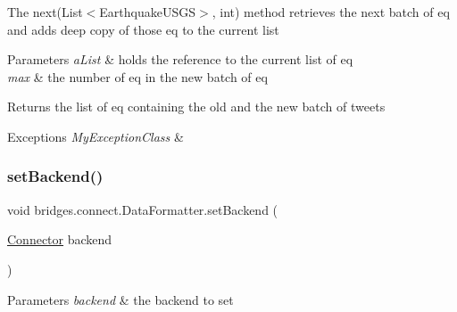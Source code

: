 The next(\+List$<$\+Earthquake\+U\+S\+G\+S$>$, int) method retrieves the next batch of eq and adds deep copy of those eq to the current list 
\begin{DoxyParams}{Parameters}
{\em a\+List} & holds the reference to the current list of eq \\
\hline
{\em max} & the number of eq in the new batch of eq \\
\hline
\end{DoxyParams}
\begin{DoxyReturn}{Returns}
the list of eq containing the old and the new batch of tweets 
\end{DoxyReturn}

\begin{DoxyExceptions}{Exceptions}
{\em My\+Exception\+Class} & \\
\hline
\end{DoxyExceptions}
\hypertarget{classbridges_1_1connect_1_1_data_formatter_af9b878e5c092234a6ab5f8c11bee1fbd}{}\label{classbridges_1_1connect_1_1_data_formatter_af9b878e5c092234a6ab5f8c11bee1fbd} 
\subsubsection{\texorpdfstring{set\+Backend()}{setBackend()}}
{\footnotesize\ttfamily void bridges.\+connect.\+Data\+Formatter.\+set\+Backend (\begin{DoxyParamCaption}\item[{\hyperlink{classbridges_1_1connect_1_1_connector}{Connector}}]{backend }\end{DoxyParamCaption})\hspace{0.3cm}{\ttfamily [protected]}}


\begin{DoxyParams}{Parameters}
{\em backend} & the backend to set \\
\hline
\end{DoxyParams}
\hypertarget{classbridges_1_1connect_1_1_data_formatter_a8490f20e53678329c1f74fcfc0088230}{}\label{classbridges_1_1connect_1_1_data_formatter_a8490f20e53678329c1f74fcfc0088230} 
